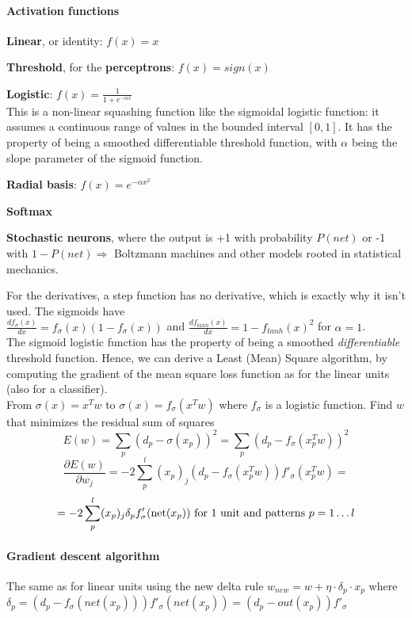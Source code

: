 \documentclass[10pt]{report}
\begin{document}
\paragraph{Activation functions}
\begin{list}{}{}
	\item \textbf{Linear}, or identity: $f(x) = x$
	\item \textbf{Threshold}, for the \textbf{perceptrons}: $f(x) = sign(x)$
	\item \textbf{Logistic}: $f(x) = \frac{1}{1 + e^{-\alpha x}}$\\
	This is a non-linear squashing function like the sigmoidal logistic function: it assumes a continuous range of values in the bounded interval $[0,1]$. It has the property of being a smoothed differentiable threshold function, with $\alpha$ being the slope parameter of the sigmoid function.
	\item \textbf{Radial basis}: $f(x) = e^{-\alpha x^2}$
	\item \textbf{Softmax}
	\item \textbf{Stochastic neurons}, where the output is +1 with probability $P(net)$ or -1 with $1-P(net) \Rightarrow$ Boltzmann machines and other models rooted in statistical mechanics.
\end{list}
For the derivatives, a step function has no derivative, which is exactly why it isn't used. The sigmoids have\\$\frac{df_\sigma(x)}{dx} = f_\sigma(x) (1-f_\sigma(x))$ and $\frac{df_{tanh}(x)}{dx} = 1 - f_{tanh}(x)^2$ for $\alpha = 1$.\\
The sigmoid logistic function has the property of being a smoothed \textit{differentiable} threshold function. Hence, we can derive a Least (Mean) Square algorithm, by computing the gradient of the mean square loss function as for the linear units (also for a classifier).\\
From $\sigma(x) = x^Tw$ to $\sigma(x) = f_\sigma(x^Tw)$ where $f_\sigma$ is a logistic function. Find $w$ that minimizes the residual sum of squares $$E(w) = \sum_p (d_p - \sigma(x_p))^2 = \sum_p (d_p - f_\sigma(x_p^Tw))^2$$
$$\frac{\partial E(w)}{\partial w_j} = -2\sum_p^l (x_p)_j (d_p - f_\sigma(x_p^Tw))f'_\sigma(x_p^Tw) =$$ $$= -2\sum_p^l(x_p)_j\delta_pf'_\sigma(\hbox{net}(x_p))\hbox{ for 1 unit and patterns }p = 1\ldots l$$
\paragraph{Gradient descent algorithm} 
The same as for linear units using the new delta rule $w_{new} = w + \eta\cdot\delta_p\cdot x_p$ where $\delta_p = (d_p - f_\sigma(net(x_p)))f'_\sigma(net(x_p)) = (d_p-out(x_p))f'_\sigma$
\end{document}
